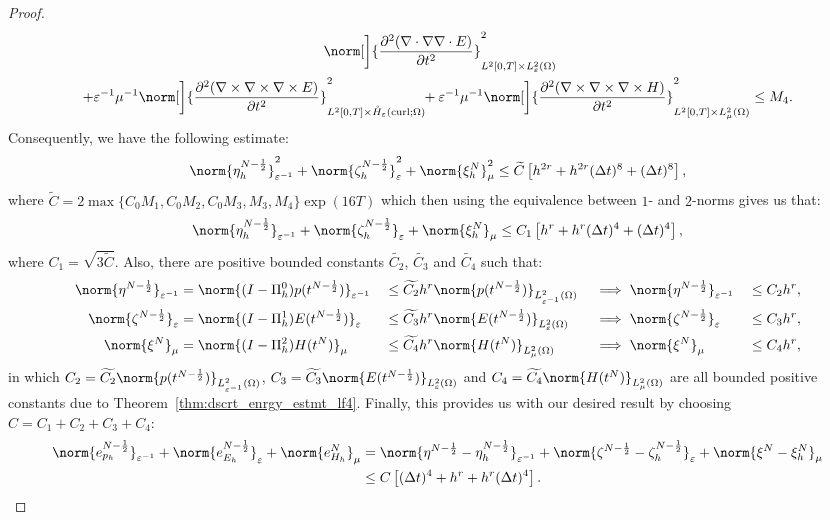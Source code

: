 \documentclass{amsart}
\theoremstyle{thmstyleone}%
\theoremstyle{thmstyletwo}%
\theoremstyle{thmstylethree}%
\DeclareMathOperator{\curl}{curl}
\begin{document}
\begin{proof}
\begin{multline*}
  \norm[\bigg]{\dfrac{\partial^2 (\nabla \cdot \nabla \nabla \cdot E)}{\partial t^2}}^2_{L^2[0, T] \times L^2_\varepsilon(\Omega)} \!\! \\ + \varepsilon^{-1} \mu^{-1} \norm[\bigg]{\dfrac{\partial^2 (\nabla \times \nabla \times \nabla \times E)}{\partial t^2}}^2_{L^2[0, T] \times \mathring{H}_\varepsilon(\curl; \Omega)} \!\! + \varepsilon^{-1} \mu^{-1} \norm[\bigg]{\dfrac{\partial^2 (\nabla \times \nabla \times \nabla \times H)}{\partial t^2}}^2_{L^2[0, T] \times L^2_\mu(\Omega)} \leq M_4.
\end{multline*}
Consequently, we have the following estimate:
\[
  \norm{\eta_h^{N-\frac{1}{2}}}^2_{\varepsilon^{-1}} + \norm{\zeta_h^{N-\frac{1}{2}}}^2_{\varepsilon} + \norm{\xi_h^N}^2_{\mu} \le \widetilde{C} \left[h^{2 r} + h^{2 r} (\Delta t)^8 + (\Delta t)^8 \right],
\]
where $\widetilde{C} = 2 \max\{C_0 M_1, C_0 M_2, C_0 M_3, M_3, M_4 \} \exp(16 T)$ which then using the equivalence between $1$- and $2$-norms gives us that:
\[
  \norm{\eta_h^{N-\frac{1}{2}}}_{\varepsilon^{-1}} + \norm{\zeta_h^{N-\frac{1}{2}}}_{\varepsilon} + \norm{\xi_h^N}_{\mu} \le C_1 \left[h^{r} + h^r (\Delta t)^4 + (\Delta t)^4 \right],
\]
where $C_1 = \sqrt{3 \widetilde{C}}$. Also, there are positive bounded constants $\widetilde{C_2}$, $\widetilde{C_3}$ and $\widetilde{C_4}$ such that:
\begin{alignat*}{4}
  \norm{\eta^{N-\frac{1}{2}}}_{\varepsilon^{-1}} &= \norm{(I - \Pi_h^0) p(t^{N-\frac{1}{2}})}_{\varepsilon^{-1}} &&\le \widetilde{C_2} h^r \norm{p(t^{N-\frac{1}{2}})}_{L^2_{\varepsilon^{-1}}(\Omega)} &&\implies \norm{\eta^{N-\frac{1}{2}}}_{\varepsilon^{-1}} &&\le C_2 h^r, \\
  \norm{\zeta^{N-\frac{1}{2}}}_{\varepsilon} &= \norm{(I - \Pi_h^1) E(t^{N-\frac{1}{2}})}_{\varepsilon} &&\le \widetilde{C_3} h^r \norm{E(t^{N-\frac{1}{2}})}_{L^2_{\varepsilon}(\Omega)} &&\implies \norm{\zeta^{N-\frac{1}{2}}}_{\varepsilon} &&\le C_3 h^r, \\
  \norm{\xi^N}_\mu &= \norm{(I - \Pi_h^2) H(t^N)}_\mu &&\le \widetilde{C_4} h^r \norm{H(t^N)}_{L^2_{\mu}(\Omega)} &&\implies \norm{\xi^N}_\mu &&\le C_4 h^r,
\end{alignat*}
in which $C_2 = \widetilde{C_2} \norm{p(t^{N-\frac{1}{2}})}_{L^2_{\varepsilon^{-1}}(\Omega)}$, $C_3 = \widetilde{C_3} \norm{E(t^{N-\frac{1}{2}})}_{L^2_{\varepsilon}(\Omega)}$ and $C_4 = \widetilde{C_4} \norm{H(t^N)}_{L^2_{\mu}(\Omega)}$ are all bounded positive constants due to Theorem~\ref{thm:dscrt_enrgy_estmt_lf4}. Finally, this provides us with our desired result by choosing $C = C_1 + C_2 + C_3 + C_4$:
\begin{align*}
  \norm{e_{p_h}^{N - \frac{1}{2}}}_{\varepsilon^{-1}} + \norm{e_{E_h}^{N - \frac{1}{2}}}_{\varepsilon} + \norm{e_{H_h}^{N}}_{\mu} &= \norm{\eta^{N - \frac{1}{2}} - \eta^{N - \frac{1}{2}}_h}_{\varepsilon^{-1}} + \norm{\zeta^{N - \frac{1}{2}} - \zeta^{N - \frac{1}{2}}_h}_{\varepsilon} + \norm{\xi^N - \xi^N_h}_\mu \\
  &\le C \left[ (\Delta t )^4 + h^r + h^r (\Delta t)^4 \right]. \qedhere
\end{align*}
\end{proof}
\end{document}
